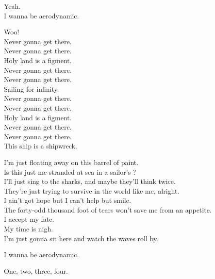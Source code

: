 Yeah. \\
I wanna be aerodynamic. \\


Woo! \\
Never gonna get there. \\
Never gonna get there. \\
Holy land is a figment. \\
Never gonna get there. \\
Never gonna get there. \\
Sailing for infinity. \\
Never gonna get there. \\
Never gonna get there. \\
Holy land is a figment. \\
Never gonna get there. \\
Never gonna get there. \\
This ship is a shipwreck. \\


I'm just floating away on this barrel of paint. \\
Is this just me stranded at sea in a sailor's ? \\
I'll just sing to the sharks, and maybe they'll think twice. \\
They're just trying to survive in the world like me, alright. \\
I ain't got hope but I can't help but smile. \\
The forty-odd thousand foot of tears won't save me from an appetite. \\
I accept my fate. \\
My time is nigh. \\
I'm just gonna sit here and watch the waves roll by. \\


I wanna be aerodynamic. \\





One, two, three, four. \\

